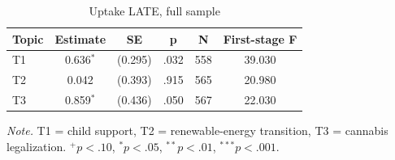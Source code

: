 \begin{table}[htbp]
\centering
\begin{threeparttable}
\caption{Uptake LATE, full sample}
\label{tab:tab_h4b_late_full}
\begin{tabular}{lccccc}
\toprule
  Topic & Estimate & SE & p & N & First-stage F \\
\midrule
  T1 & 0.636$^{*}$ & (0.295) & .032 & 558 & 39.030 \\
  T2 & 0.042 & (0.393) & .915 & 565 & 20.980 \\
  T3 & 0.859$^{*}$ & (0.436) & .050 & 567 & 22.030 \\
\bottomrule
\end{tabular}
\begin{tablenotes}\footnotesize\item \textit{Note.} T1 = child support, T2 = renewable-energy transition, T3 = cannabis legalization. $^{+}p<.10$, $^{*}p<.05$, $^{**}p<.01$, $^{***}p<.001$.\end{tablenotes}
\end{threeparttable}
\end{table}
